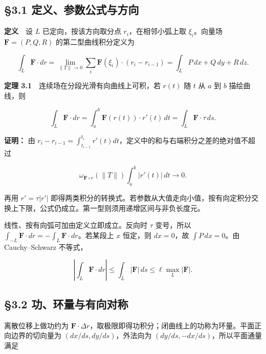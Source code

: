 \documentclass[11pt,a4paper]{article}
\begin{document}
\subsection{§3.1
定义、参数公式与方向}\label{ux5b9aux4e49ux53c2ux6570ux516cux5f0fux4e0eux65b9ux5411}

\textbf{定义}　设 \(L\) 已定向，按该方向取分点 \(r_i\)，在相邻小弧上取
\(\xi_i\)。向量场 \(\mathbf F=(P,Q,R)\) 的第二型曲线积分定义为

\begin{equation*}
 \int_L\mathbf F\cdot dr
 =\lim_{\|T\|\to0}\sum_i\mathbf F(\xi_i)\cdot(r_i-r_{i-1})
 =\int_LP\,dx+Q\,dy+R\,dz.
\end{equation*}

\textbf{定理 3.1}　连续场在分段光滑有向曲线上可积，若 \(r(t)\) 随 \(t\)
从 \(a\) 到 \(b\) 描绘曲线，则

\begin{equation*}
 \int_L\mathbf F\cdot dr
 =\int_a^b\mathbf F(r(t))\cdot r'(t)\,dt
 =\int_L\mathbf F\cdot\tau\,ds.\tag{3.1}
\end{equation*}

\textbf{证明：} 由
\(r_i-r_{i-1}=\int_{t_{i-1}}^{t_i}r'(t)dt\)，定义中的和与右端积分之差的绝对值不超过

\begin{equation*}
 \omega_{\mathbf F\circ r}(\|T\|)\int_a^b|r'(t)|\,dt\longrightarrow0.
\end{equation*}

再用 \(r'=\tau|r'|\)
即得两类积分的转换式。若参数从大值走向小值，按有向定积分交换上下限，公式仍成立。第一型则须用递增区间与非负长度元。

线性、按有向弧可加由定义立即成立。反向时 \(\tau\) 变号，所以
\(\int_{-L}\mathbf F\cdot dr=-\int_L\mathbf F\cdot dr\)。若某段上 \(x\)
恒定，则 \(dx=0\)，故 \(\int P\,dx=0\)。由 Cauchy--Schwarz 不等式，

\begin{equation*}
 \left|\int_L\mathbf F\cdot dr\right|
 \le\int_L|\mathbf F|\,ds\le\ell\max_L|\mathbf F|.\tag{3.2}
\end{equation*}

\subsection{§3.2
功、环量与有向对称}\label{ux529fux73afux91cfux4e0eux6709ux5411ux5bf9ux79f0}

离散位移上做功约为
\(\mathbf F\cdot\Delta r\)，取极限即得功积分；闭曲线上的功称为环量。平面正向边界的切向量为
\((dx/ds,dy/ds)\)，外法向为 \((dy/ds,-dx/ds)\)，所以平面通量满足
\end{document}
